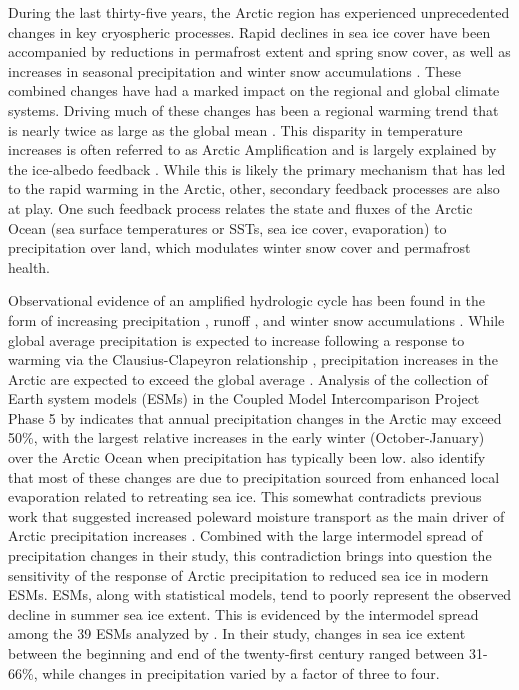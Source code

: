 \documentclass[draft,linenumbers]{agujournal}
\begin{document}
During the last thirty-five years, the Arctic region has experienced unprecedented changes in key cryospheric processes.
Rapid declines in sea ice cover have been accompanied by reductions in permafrost extent and spring snow cover, as well as increases in seasonal precipitation and winter snow accumulations \citep{Kohler_2006,Callaghan_2011,Bulygina_2009,Screen_2012}.
These combined changes have had a marked impact on the regional and global climate systems.
Driving much of these changes has been a regional warming trend that is nearly twice as large as the global mean \citep{Serreze_2006c,Screen_2010}.
This disparity in temperature increases is often referred to as Arctic Amplification and is largely explained by the ice-albedo feedback \citep{Curry_1995}.
While this is likely the primary mechanism that has led to the rapid warming in the Arctic, other, secondary feedback processes are also at play.
One such feedback process relates the state and fluxes of the Arctic Ocean (sea surface temperatures or SSTs, sea ice cover, evaporation) to precipitation over land, which modulates winter snow cover and permafrost health.

Observational evidence of an amplified hydrologic cycle \citep{Stocker_2005} has been found in the form of increasing precipitation \citep{Rawlins_2006}, runoff \citep{Peterson_2002}, and winter snow accumulations \citep{Kohler_2006,Bulygina_2009,Screen_2012}.
While global average precipitation is expected to increase following a response to warming via the Clausius-Clapeyron relationship \citep[e.g.][]{Held_2006,Stephens_2008,Byrne_2015}, precipitation increases in the Arctic are expected to exceed the global average \citep{Stocker_2005}.
Analysis of the collection of Earth system models (ESMs) in the Coupled Model Intercomparison Project Phase 5 \citep[CMIP5;][]{Taylor_2012} by \citet{Bintanja_2014} indicates that annual precipitation changes in the Arctic may exceed 50\%, with the largest relative increases in the early winter (October-January) over the Arctic Ocean when precipitation has typically been low.
\citet{Bintanja_2014} also identify that most of these changes are due to precipitation sourced from enhanced local evaporation related to retreating sea ice.
This somewhat contradicts previous work that suggested increased poleward moisture transport as the main driver of Arctic precipitation increases \citep{Bengtsson_2011}.
Combined with the large intermodel spread of precipitation changes in their study, this contradiction brings into question the sensitivity of the response of Arctic precipitation to reduced sea ice in modern ESMs.
ESMs, along with statistical models, tend to poorly represent the observed decline in summer sea ice extent.
This is evidenced by the intermodel spread among the 39 ESMs analyzed by \citet{Bintanja_2014}.
In their study, changes in sea ice extent between the beginning and end of the twenty-first century ranged between 31-66\%, while changes in precipitation varied by a factor of three to four.
\end{document}
